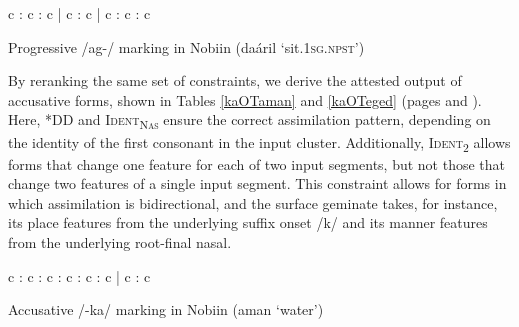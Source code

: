 \documentclass[output=paper]{langscibook}
\begin{document}
\begin{sidewaystable}
\ShadingOn
\begin{tableau}{c : c : c | c : c | c : c : c}
         
 \vio{*!} \vio{} \vio{} \vio{} \vio{} \vio{} \vio{} \vio{}
 \vio{*!} \vio{} \vio{} \vio{} \vio{} \vio{} \vio{} \vio{}
 \vio{} \vio{*!} \vio{} \vio{} \vio{} \vio{} \vio{} \vio{}
 \vio{} \vio{} \vio{*!} \vio{} \vio{} \vio{*} \vio{} \vio{}
 \vio{} \vio{} \vio{} \vio{} \vio{*} \vio{*} \vio{} \vio{}
 \vio{} \vio{} \vio{} \vio{*} \vio{} \vio{} \vio{} \vio{}
\end{tableau}
\caption{Progressive /ag-/ marking in Nobiin (daáril `sit.\textsc{1sg.npst}')} \label{agOTdaaril}
\end{sidewaystable}

By reranking the same set of constraints, we derive the attested output of accusative forms, shown in Tables \ref{kaOTaman} and \ref{kaOTeged} (pages \pageref{kaOTaman} and \pageref{kaOTeged}). Here, *DD and \textsc{Ident\textsubscript{Nas}} ensure the correct assimilation pattern, depending on the identity of the first consonant in the input cluster. Additionally, \textsc{Ident\textsubscript{2}} allows forms that change one feature for each of two input segments, but not those that change two features of a single input segment. This constraint allows for forms in which assimilation is bidirectional, and the surface geminate takes, for instance, its place features from the underlying suffix onset /k/ and its manner features from the underlying root-final nasal. 

\begin{sidewaystable}
\ShadingOn
\begin{tableau}{c : c : c : c : c : c | c : c }
                  
 \vio{*!} \vio{} \vio{} \vio{} \vio{} \vio{*} \vio{} \vio{}
 \vio{*!} \vio{} \vio{} \vio{} \vio{} \vio{*} \vio{} \vio{}
 \vio{} \vio{*!} \vio{} \vio{} \vio{} \vio{} \vio{} \vio{}
 \vio{} \vio{} \vio{} \vio{} \vio{*!} \vio{} \vio{**} \vio{*} 
 \vio{} \vio{} \vio{} \vio{*!} \vio{*} \vio{} \vio{**} \vio{}
 \vio{} \vio{} \vio{} \vio{*!} \vio{} \vio{} \vio{**} \vio{*}
 \vio{} \vio{} \vio{} \vio{} \vio{} \vio{} \vio{**} \vio{*}
 \vio{} \vio{} \vio{} \vio{} \vio{} \vio{*!} \vio{*} \vio{*}
\end{tableau}
\caption{Accusative /-ka/ marking in Nobiin (aman `water')} \label{kaOTaman}
\end{sidewaystable}
\end{document}
